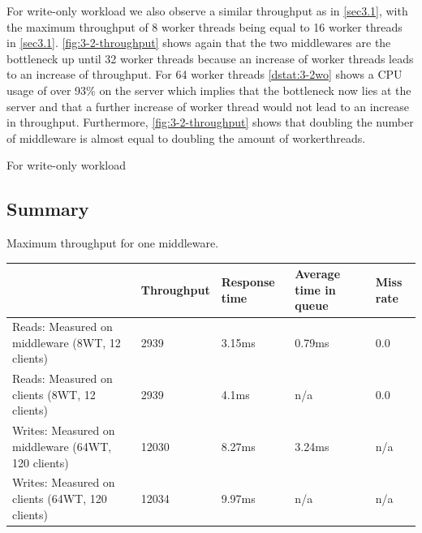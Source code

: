 \documentclass[11pt,a4paper]{article}
\begin{document}
For write-only workload we also observe a similar throughput as in \autoref{sec3.1}, with the maximum throughput of 8 worker threads being equal to 16 worker threads in \autoref{sec3.1}. \autoref{fig:3-2-throughput} shows again that the two middlewares are the bottleneck up until 32 worker threads because an increase of worker threads leads to an increase of throughput. For 64 worker threads \autoref{dstat:3-2wo} shows a CPU usage of over 93\% on the server which implies that the bottleneck now lies at the server and that a further increase of worker thread would not lead to an increase in throughput.
Furthermore, \autoref{fig:3-2-throughput} shows that doubling the number of middleware is almost equal to doubling the amount of workerthreads.


For write-only workload
\subsection{Summary}



\begin{center}
	{Maximum throughput for one middleware.}
	\begin{tabular}{|l|p{2cm}|p{2cm}|p{2cm}|p{2cm}|}
		\hline                                                   & Throughput     & Response time & Average time in queue & Miss rate \\ 
		\hline Reads: Measured on middleware (8WT, 12 clients)   &     2939       &    3.15ms     & 0.79ms                & 0.0       \\ 
		\hline Reads: Measured on clients (8WT, 12 clients)      &     2939       &    4.1ms      & n/a                   & 0.0       \\ 
		\hline Writes: Measured on middleware (64WT, 120 clients)&     12030      &    8.27ms     & 3.24ms                & n/a       \\ 
		\hline Writes: Measured on clients (64WT, 120 clients)   &     12034      &    9.97ms     & n/a                   & n/a       \\ 
		\hline 
	\end{tabular}
\end{center}
\end{document}
